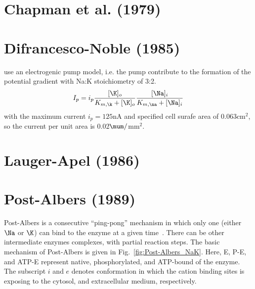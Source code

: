


\section{Chapman et al. (1979)}
\label{sec:nak-pump:-chapman}

\section{Difrancesco-Noble (1985)}

\citep{difrancesco1985mcea} use an electrogenic pump model, i.e. the pump
contribute to the formation of the potential gradient with Na:K stoichiometry of
3:2. 
\begin{equation}
I_p = i_p \frac{[\K]_o}{K_{m,\k}+[\K]_o} \frac{[\Na]_i}{K_{m,\na}+[\Na]_i}
\end{equation}
with the maximum current $i_p=125$nA and specified cell surafe area of
0.063cm$^2$, so the current per unit area is 0.02$\mum/$mm$^2$. 



\section{Lauger-Apel (1986)}
\label{sec:nak-pump:-lauger}


\section{Post-Albers (1989)}
\label{sec:nak-pump:-post}

Post-Albers is a consecutive ``ping-pong'' mechanism in which only one
(either $\Na$ or $\K$) can bind to the enzyme at a given
time~\citep{apell1989}. There can be other intermediate enzymes
complexes, with partial reaction steps. The basic mechanism of
Post-Albers is given in Fig.~\ref{fig:Post-Albers_NaK}. Here, E, P-E,
and ATP-E represent native, phosphorylated, and ATP-bound of the
enzyme. The subscript $i$ and $e$ denotes conformation in which the
cation binding sites is exposing to the cytosol, and extracellular
medium, respectively. 

